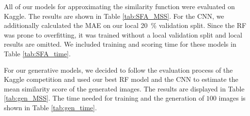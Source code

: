 \documentclass[10pt,conference,compsocconf]{IEEEtran}
\begin{document}
All of our models for approximating the similarity function were evaluated on Kaggle. The results are shown in Table \ref{tab:SFA_MSS}.
For the CNN, we additionally calculated the MAE on our local \SI{20}{\percent} validation split. Since the RF was prone to overfitting, it was trained without a local validation split and local results are omitted. We included training and scoring time for these models in Table \ref{tab:SFA_time}. 




For our generative models, we decided to follow the evaluation process of the Kaggle competition and used our best RF model and the CNN to estimate the mean similarity score of the generated images. The results are displayed in Table \ref{tab:gen_MSS}. The time needed for training and the generation of $100$ images is shown in Table \ref{tab:gen_time}. 
\end{document}
